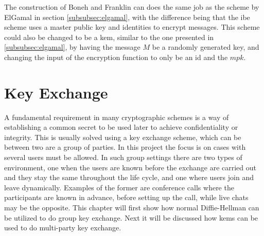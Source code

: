 \par The construction of Boneh and Franklin can does the same job as the scheme by ElGamal in section \ref{subsubsec:elgamal}, with the difference being that the \gls{ibe} scheme uses a master public key and identities to encrypt messages. This scheme could also be changed to be a \gls{kem}, similar to the one presented in \ref{subsubsec:elgamal}, by having the message $M$ be a randomly generated key, and changing the input of the encryption function to only be an id and the $mpk$.



\section{Key Exchange}\label{sec:key_exchange}
A fundamental requirement in many cryptographic schemes is a way of establishing a common secret to be used later to achieve confidentiality or integrity. This is usually solved using a key exchange scheme, which can be between two are a group of parties. In this project the focus is on cases with several users must be allowed. In such group settings there are two types of environment, one when the users are known before the exchange are carried out and they stay the same throughout the life cycle, and one where users join and leave dynamically. Examples of the former are conference calls where the participants are known in advance, before setting up the call, while live chats may be the opposite. This chapter will first show how normal Diffie-Hellman can be utilized to do group key exchange. Next it will be discussed how \glspl{kem} can be used to do multi-party key exchange.


